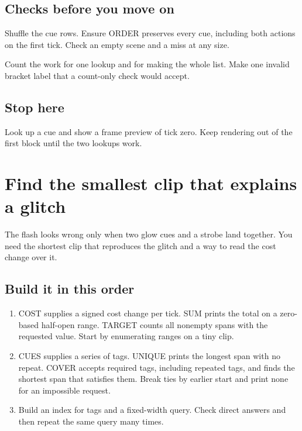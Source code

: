 \documentclass[11pt,letterpaper]{article}
\begin{document}
\subsection*{Checks before you move on}

Shuffle the cue rows. Ensure ORDER preserves every cue, including both actions on the first tick. Check an empty scene and a miss at any size.

Count the work for one lookup and for making the whole list. Make one invalid bracket label that a count-only check would accept.

\subsection*{Stop here}

Look up a cue and show a frame preview of tick zero. Keep rendering out of the first block until the two lookups work.

\clearpage

\section{Find the smallest clip that explains a glitch}\label{visuals:02}

The flash looks wrong only when two glow cues and a strobe land together. You need the shortest clip that reproduces the glitch and a way to read the cost change over it.

\subsection*{Build it in this order}

\begin{enumerate}
\item COST supplies a signed cost change per tick. SUM prints the total on a zero-based half-open range. TARGET counts all nonempty spans with the requested value. Start by enumerating ranges on a tiny clip.
\item CUES supplies a series of tags. UNIQUE prints the longest span with no repeat. COVER accepts required tags, including repeated tags, and finds the shortest span that satisfies them. Break ties by earlier start and print none for an impossible request.
\item Build an index for tags and a fixed-width query. Check direct answers and then repeat the same query many times.
\end{enumerate}
\end{document}
